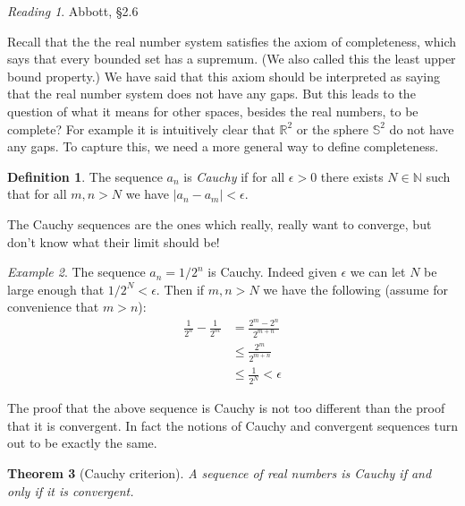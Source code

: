 \documentclass[11pt,oneside]{amsbook}
\newcommand{\N}{\mathbb N}
\newcommand{\R}{\mathbb R}
\theoremstyle{definition}
\theoremstyle{plain}
\newtheorem{thm}{Theorem}[section]
\theoremstyle{definition}
\newtheorem{defn}[thm]{Definition}
\theoremstyle{remark}
\newtheorem{example}[thm]{Example}
\newtheorem*{reading}{Reading}
\numberwithin{equation}{section}
\numberwithin{figure}{section}
\begin{document}
\begin{reading}
  Abbott, \S 2.6
\end{reading}

Recall that the the real number system satisfies the axiom of completeness, which says that every bounded set has a supremum. (We also called this the least upper bound property.) We have said that this axiom should be interpreted as saying that the real number system does not have any gaps. But this leads to the question of what it means for other spaces, besides the real numbers, to be complete? For example it is intuitively clear that $\R^2$ or the sphere $\mathbb S^2$ do not have any gaps. To capture this, we need a more general way to define completeness.

\begin{defn}
  The sequence $a_n$ is \emph{Cauchy} if for all $\epsilon>0$ there exists $N\in\N$ such that for all $m,n>N$ we have $|a_n-a_m|<\epsilon$.
\end{defn}

The Cauchy sequences are the ones which really, really want to converge, but don't know what their limit should be!

\begin{example}
  The sequence $a_n=1/2^n$ is Cauchy. Indeed given $\epsilon$ we can let $N$ be large enough that $1/2^N<\epsilon$. Then if $m,n>N$ we have the following (assume for convenience that $m>n$):
  \begin{align*}
    \frac1{2^n}-\frac1{2^m}&=\frac{2^m-2^n}{2^{m+n}}\\
    &\leq\frac{2^m}{2^{m+n}}\\
    &\leq\frac1{2^N}<\epsilon
  \end{align*}
\end{example}

The proof that the above sequence is Cauchy is not too different than the proof that it is convergent. In fact the notions of Cauchy and convergent sequences turn out to be exactly the same.

\begin{thm}[Cauchy criterion]
  A sequence of real numbers is Cauchy if and only if it is convergent.
\end{thm}
\end{document}
